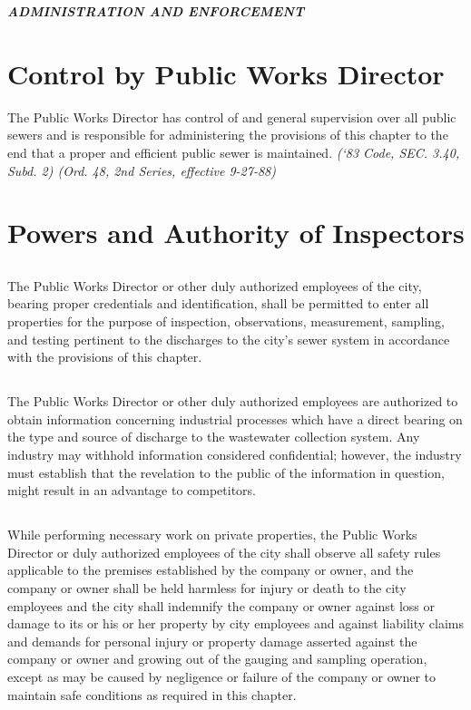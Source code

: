 \documentclass[code.tex]{subfiles}
\begin{document}
\begin{center}
\emph{\textbf{\LARGE{ADMINISTRATION AND ENFORCEMENT}}}
\end{center}

\setcounter{section}{69}
\section{Control by Public Works Director}
The Public Works Director has control of and general supervision over all public sewers and is responsible for administering the provisions of this chapter to the end that a proper and efficient public sewer is maintained.\newline
\emph{(‘83 Code, SEC. 3.40, Subd. 2) (Ord. 48, 2nd Series, effective 9-27-88)}
\section{Powers and Authority of Inspectors}
\subsection{}
The Public Works Director or other duly authorized employees of the city, bearing proper credentials and identification, shall be permitted to enter all properties for the purpose of inspection, observations, measurement, sampling, and testing pertinent to the discharges to the city’s sewer system in accordance with the provisions of this chapter.
\subsection{}
The Public Works Director or other duly authorized employees are authorized to obtain information concerning industrial processes which have a direct bearing on the type and source of discharge to the wastewater collection system.  Any industry may withhold information considered confidential; however, the industry must establish that the revelation to the public of the information in question, might result in an advantage to competitors.
\subsection{}
While performing necessary work on private properties, the Public Works Director or duly authorized employees of the city shall observe all safety rules applicable to the premises established by the company or owner, and the company or owner shall be held harmless for injury or death to the city employees and the city shall indemnify the company or owner against loss or damage to its or his or her property by city employees and against liability claims and demands for personal injury or property damage asserted against the company or owner and growing out of the gauging and sampling operation, except as may be caused by negligence or failure of the company or owner to maintain safe conditions as required in this chapter.
\end{document}
